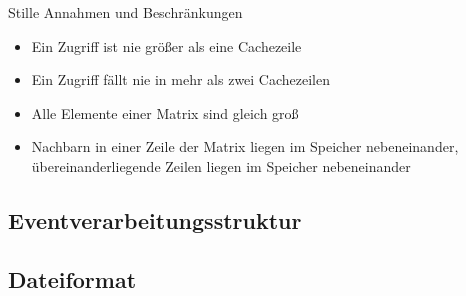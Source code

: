 \begin{frame}
        \begin{block}{Stille Annahmen und Beschränkungen}
                \begin{itemize}
                        \pause \item Ein Zugriff ist nie größer als eine Cachezeile
                               \item Ein Zugriff fällt nie in mehr als zwei Cachezeilen
                        \pause \item Alle Elemente einer Matrix sind gleich groß
                        \pause \item Nachbarn in einer Zeile der Matrix liegen im Speicher nebeneinander, übereinanderliegende Zeilen liegen im Speicher nebeneinander
                \end{itemize}
        \end{block}
\end{frame}

\subsection{Eventverarbeitungsstruktur} 
\subsection{Dateiformat} 